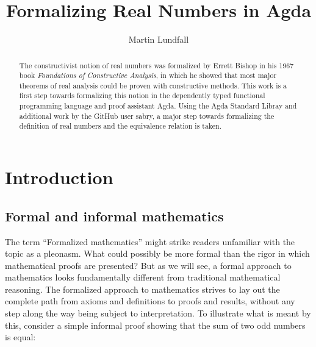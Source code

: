 \documentclass[11pt,a4paper]{article}
\title{Formalizing Real Numbers in Agda}
\author{Martin Lundfall}
\begin{document}

\maketitle
\begin{abstract}
The constructivist notion of real numbers was formalized by Errett Bishop in his 1967 book \textit{Foundations of Constructive Analysis}, in which he showed that most major theorems of real analysis could be proven with constructive methods. This work is a first step towards formalizing this notion in the dependently typed functional programming language and proof assistant Agda. Using the Agda Standard Libray and additional work by the GitHub user sabry, a major step towards formalizing the definition of real numbers and the equivalence relation is taken.
\end{abstract}
\begin{comment}
\begin{abstract}
The decentralized infrastructure of the blockchain technology Ethereum opens a new set of possibilities for sharing content in a programmable environment. In particular, it is highly suitable for creating a standard library of formalized mathematics to which everyone can add contributions. The database can in theory be automatically checked for validity and to avoid unnecessary repetitions, scanned for relevant results, or even serve as an interactive foundation of a formalized structure of knowledge. The trustless nature of Ethereum allows communities to make democratic decisions on what contributions should be included in the database, or place bounties on particularly sought functions or proofs.
\end{abstract}
\end{comment}
\clearpage
\tableofcontents{}
\clearpage
\section{Introduction}\label{sec: Introduction}
\subsection{Formal and informal mathematics}\label{subsec: formal & informal}
The term ``Formalized mathematics'' might strike readers unfamiliar with the topic as a pleonasm. What could possibly be more formal than the rigor in which mathematical proofs are presented? But as we will see, a formal approach to mathematics looks fundamentally different from traditional mathematical reasoning. The formalized approach to mathematics strives to lay out the complete path from axioms and definitions to proofs and results, without any step along the way being subject to interpretation. To illustrate what is meant by this, consider a simple informal proof showing that the sum of two odd numbers is equal:\\
\end{document}
